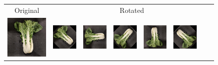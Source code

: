 \bgroup
\def\arraystretch{1.5}
\begin{figure}[tp]
	\begin{center}
		\begin{tabular}{c|ccccccc}
			Original & \multicolumn{7}{c}{Rotated} \\
			\includegraphics[scale=0.4]{./img/bokchoi_0.png} &
			\includegraphics[scale=0.4]{./img/bokchoi_1.png} &
			\includegraphics[scale=0.4]{./img/bokchoi_2.png} &
			\includegraphics[scale=0.4]{./img/bokchoi_3.png} &
			\includegraphics[scale=0.4]{./img/bokchoi_4.png} &
			\includegraphics[scale=0.4]{./img/bokchoi_5.png} &

\end{tabular}
\end{center}
\end{figure}
